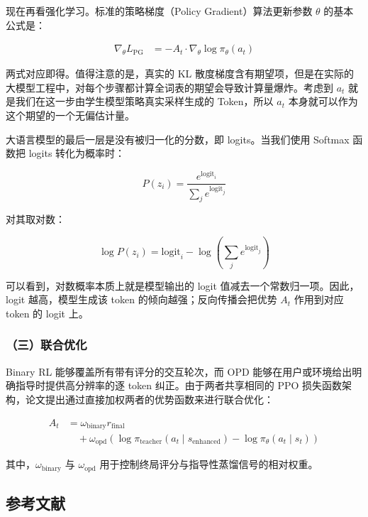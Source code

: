 现在再看强化学习。标准的策略梯度（Policy Gradient）算法更新参数 \(\theta\) 的基本公式是：

\[
\begin{aligned}
\nabla_\theta L_{\mathrm{PG}}
&= -A_t \cdot \nabla_\theta \log \pi_\theta(a_t)
\end{aligned}
\]

两式对应即得。值得注意的是，真实的 KL 散度梯度含有期望项，但是在实际的大模型工程中，对每个步骤都计算全词表的期望会导致计算量爆炸。考虑到 \(a_t\) 就是我们在这一步由学生模型策略真实采样生成的 Token，所以 \(a_t\) 本身就可以作为这个期望的一个无偏估计量。

大语言模型的最后一层是没有被归一化的分数，即 logits。当我们使用 Softmax 函数把 logits 转化为概率时：

\[
P(z_i)=\frac{e^{\mathrm{logit}_i}}{\sum_j e^{\mathrm{logit}_j}}
\]

对其取对数：

\[
\log P(z_i)=\mathrm{logit}_i-\log\left(\sum_j e^{\mathrm{logit}_j}\right)
\]

可以看到，对数概率本质上就是模型输出的 logit 值减去一个常数归一项。因此，logit 越高，模型生成该 token 的倾向越强；反向传播会把优势 \(A_t\) 作用到对应 token 的 logit 上。

\hypertarget{ux4e09ux8054ux5408ux4f18ux5316}{%
\subsubsection{（三）联合优化}\label{ux4e09ux8054ux5408ux4f18ux5316}}

Binary RL 能够覆盖所有带有评分的交互轮次，而 OPD 能够在用户或环境给出明确指导时提供高分辨率的逐 token 纠正。由于两者共享相同的 PPO 损失函数架构，论文提出通过直接加权两者的优势函数来进行联合优化：

\[
\begin{aligned}
A_t
&=
\omega_{\mathrm{binary}} r_{\mathrm{final}}
\\
&\quad+
\omega_{\mathrm{opd}}
\left(
\log \pi_{\mathrm{teacher}}(a_t\mid s_{\mathrm{enhanced}})
-\log \pi_\theta(a_t\mid s_t)
\right)
\end{aligned}
\]

其中，\(\omega_{\mathrm{binary}}\) 与 \(\omega_{\mathrm{opd}}\) 用于控制终局评分与指导性蒸馏信号的相对权重。

\hypertarget{ux53c2ux8003ux6587ux732e-151}{%
\subsection{参考文献}\label{ux53c2ux8003ux6587ux732e-151}}

